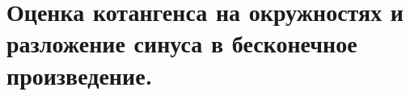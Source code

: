 \section{Оценка котангенса на окружностях и разложение синуса в бесконечное произведение.}

\newpage


